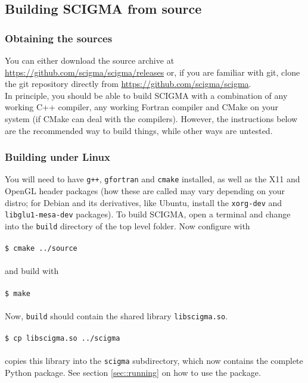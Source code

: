 \documentclass[10pt,a4paper,titlepage]{article}
\newcommand{\T}[1]{\texttt{#1}}
\newcommand{\C}[1]{\\\\\T{#1}\\\\}
\begin{document}
\subsection{Building SCIGMA from source}
\label{sec::building}
\subsubsection{Obtaining the sources}
You can either download the source archive at \url{https://github.com/scigma/scigma/releases}
or, if you are familiar with git, clone the git repository directly from \url{https://github.com/scigma/scigma}.\\
In principle, you should be able to build SCIGMA with a combination of any  working C++ compiler, any working Fortran compiler and CMake on your system (if CMake can deal with the compilers). However, the instructions below are the recommended way to build things, while other ways are untested.
\subsubsection{Building under Linux}
You will need to have \T{g++}, \T{gfortran} and \T{cmake} installed, as well as the X11 and OpenGL header packages (how these are called may vary depending on your distro; for Debian and its derivatives, like Ubuntu, install the \T{xorg-dev} and \T{libglu1-mesa-dev} packages).
 To build SCIGMA, open a terminal and change into the \T{build} directory of the
 top level folder. Now configure with
 \C{\$ cmake ../source}
 and build with
 \C{\$ make}
 Now, \T{build} should contain the shared library \T{libscigma.so}.
 \C{\$ cp libscigma.so ../scigma}
 copies this library into the \T{scigma} subdirectory, which now contains the
 complete Python package. See section \ref{sec::running} on how to use the package.	 
\end{document}
